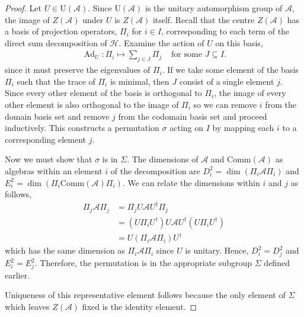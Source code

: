 \documentclass[10pt,a4paper]{amsart}
\DeclareMathOperator{\Ad}{Ad}
\newcommand{\comm}{\mathrm{Comm}}
\begin{document}
\begin{proof}
  Let $U \in \mathrm{U}(\mathcal{A})$.
  Since $\mathrm{U}(\mathcal{A})$ is the unitary automorphism group of $\mathcal{A}$, the image of $Z(\mathcal{A})$ under $U$ is $Z(\mathcal{A})$ itself.
  Recall that the centre $Z(\mathcal{A})$ has a basis of projection operators, $\Pi_i$ for $i \in I$, corresponding to each term of the direct sum decomposition of $\mathcal{H}$.
  Examine the action of $U$ on this basis,
  \begin{align}
      \Ad_U : \Pi_i \mapsto \sum_{j \in J} \Pi_j & \text{ for some $J \subseteq I$.}
  \end{align}
  since it must preserve the eigenvalues of $\Pi_i$.
  If we take some element of the basis $\Pi_i$ such that the trace of $\Pi_i$ is minimal, then $J$ consist of a single element $j$.
  Since every other element of the basis is orthogonal to $\Pi_i$, the image of every other element is also orthogonal to the image of $\Pi_i$ so we can remove $i$ from the domain basis set and remove $j$ from the codomain basis set and proceed inductively.
  This constructs a permutation $\sigma$ acting on $I$ by mapping each $i$ to a corresponding element $j$.

  Now we must show that $\sigma$ is in $\Sigma$.
  The dimensions of $\mathcal{A}$ and $\comm(\mathcal{A})$ as algebras within an element $i$ of the decomposition are $D_i^2 = \dim (\Pi_i \mathcal{A} \Pi_i)$ and $E_i^2 = \dim(\Pi_i \comm(\mathcal{A}) \Pi_i)$.
  We can relate the dimensions within $i$ and $j$ as follows,
  \begin{align}
      \Pi_j \mathcal{A} \Pi_j
      &= \Pi_j U \mathcal{A} U^\dagger \Pi_j \\
      &= (U \Pi_i U^\dagger) U \mathcal{A} U^\dagger (U \Pi_i U^\dagger) \\
      &= U (\Pi_i \mathcal{A} \Pi_i) U^\dagger
  \end{align}
  which has the same dimension as $\Pi_i \mathcal{A} \Pi_i$ since $U$ is unitary.
  Hence, $D_i^2 = D_j^2$ and $E_i^2 = E_j^2$.
  Therefore, the permutation is in the appropriate subgroup $\Sigma$ defined earlier.

  Uniqueness of this representative element follows because the only element of $\Sigma$ which leaves $Z(\mathcal{A})$ fixed is the identity element.
\end{proof}
\end{document}
